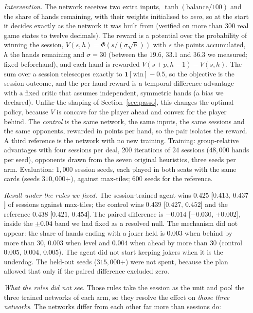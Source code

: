\documentclass[11pt]{article}
\begin{document}
\emph{Intervention.} The network receives two extra inputs, $\tanh(\text{balance}/100)$ and the share of hands remaining, with their weights initialised to \emph{zero}, so at the start it decides exactly as the network it was built from (verified on more than $300$ real game states to twelve decimals). The reward is a potential over the probability of winning the session, $V(s,h)=\Phi(s/(\sigma\sqrt{h}))$ with $s$ the points accumulated, $h$ the hands remaining and $\sigma=30$ (between the $19.6$, $33.1$ and $36.3$ we measured; fixed beforehand), and each hand is rewarded $V(s+p,h-1)-V(s,h)$. The sum over a session telescopes exactly to $\mathbf{1}[\text{win}]-0.5$, so the objective is the session outcome, and the per-hand reward is a temporal-difference advantage with a fixed critic that assumes independent, symmetric hands (a bias we declared). Unlike the shaping of Section~\ref{sec:passo}, this changes the optimal policy, because $V$ is concave for the player ahead and convex for the player behind. The \emph{control} is the same network, the same inputs, the same sessions and the same opponents, rewarded in points per hand, so the pair isolates the reward. A third reference is the network with no new training. Training: group-relative advantages with four sessions per deal, $200$ iterations of $24$ sessions ($48{,}000$ hands per seed), opponents drawn from the seven original heuristics, three seeds per arm. Evaluation: $1{,}000$ session seeds, each played in both seats with the same cards (seeds $310{,}000$+), against max-tiles; $600$ seeds for the reference.

\emph{Result under the rules we fixed.} The session-trained agent wins $0.425$ [$0.413$, $0.437$] of sessions against max-tiles; the control wins $0.439$ [$0.427$, $0.452$] and the reference $0.438$ [$0.421$, $0.454$]. The paired difference is $-0.014$ [$-0.030$, $+0.002$], inside the $\pm0.04$ band we had fixed as a resolved null. The mechanism did not appear: the share of hands ending with a joker held is $0.003$ when behind by more than $30$, $0.003$ when level and $0.004$ when ahead by more than $30$ (control $0.005$, $0.004$, $0.005$). The agent did not start keeping jokers when it is the underdog. The held-out seeds ($315{,}000$+) were not spent, because the plan allowed that only if the paired difference excluded zero.

\emph{What the rules did not see.} Those rules take the session as the unit and pool the three trained networks of each arm, so they resolve the effect on \emph{those three networks}. The networks differ from each other far more than sessions do:
\end{document}
